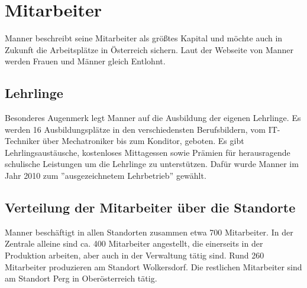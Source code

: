 \section{Mitarbeiter}
Manner beschreibt seine Mitarbeiter als größtes Kapital und möchte auch in Zukunft die Arbeitsplätze in Österreich sichern.
Laut der Webseite von Manner werden Frauen und Männer gleich Entlohnt.\cite{josef_manner}

\subsection{Lehrlinge}
Besonderes Augenmerk legt Manner auf die Ausbildung der eigenen Lehrlinge. Es werden 16 Ausbildungsplätze in den verschiedensten Berufsbildern, vom IT-Techniker über Mechatroniker bis zum Konditor, geboten. Es gibt Lehrlingsaustäusche, kostenloses Mittagessen sowie Prämien für herausragende schulische Leistungen um die Lehrlinge zu unterstützen. Dafür wurde Manner im Jahr 2010 zum ''ausgezeichnetem Lehrbetrieb'' gewählt.\cite{josef_manner}

\subsection{Verteilung der Mitarbeiter über die Standorte}
Manner beschäftigt in allen Standorten zusammen etwa 700 Mitarbeiter. In der Zentrale alleine sind ca. 400 Mitarbeiter angestellt, die einerseits in der Produktion arbeiten, aber auch in der Verwaltung tätig sind. Rund 260 Mitarbeiter produzieren am Standort Wolkersdorf. Die restlichen Mitarbeiter sind am Standort Perg in Oberösterreich tätig.\cite{josef_manner}
